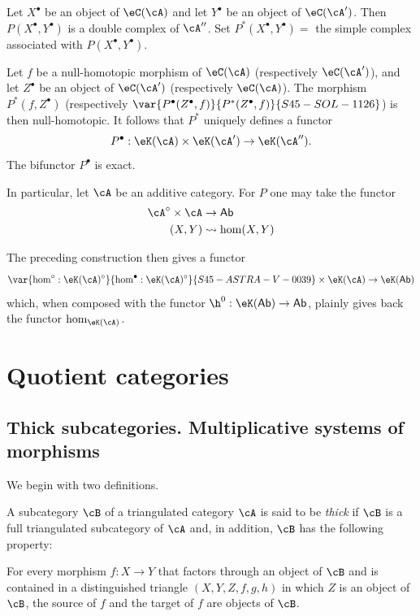 Let $X^\bullet$ be an object of $\eC(\cA)$ and let $Y^\bullet$ be an
object of $\eC(\cA')$. Then $P(X^\bullet,Y^\bullet)$ is a double complex
of $\cA''$. Set $P^\ast(X^\bullet,Y^\bullet) = $ the simple complex
associated with $P(X^\bullet,Y^\bullet)$.

Let $f$ be a null-homotopic morphism of $\eC(\cA)$ (respectively
$\eC(\cA')$), and let $Z^\bullet$ be an object of $\eC(\cA')$
(respectively $\eC(\cA)$). The morphism $P^\ast(f,Z^\bullet)$
(respectively $\var{P^\bullet(Z^\bullet,f)}{P^\ast(Z^\bullet,f)}{S45-SOL-1126}$) is then null-homotopic. It follows
that $P^\ast$ uniquely defines a functor
\[
  P^\bullet:\eK(\cA) \times \eK(\cA') \to \eK(\cA'') \text{.}
\]
The bifunctor $P^\bullet$ is exact.

In particular, let $\cA$ be an additive category. For $P$ one may take
the functor
\begin{align*}
  \cA^\circ\times \cA &\to \mathsf{Ab} \\
  (X,Y) &\leadsto \hom(X,Y)
\end{align*}

The preceding construction then gives a functor
\[
  \var{\hom^\circ:\eK(\cA)^\circ}{\hom^\bullet:\eK(\cA)^\circ}{S45-ASTRA-V-0039} \times \eK(\cA) \to \eK(\mathsf{Ab})
\]
which, when composed with the functor
$\h^0:\eK(\mathsf{Ab})\to \mathsf{Ab}$, plainly gives back the functor
$\hom_{\eK(\cA)}$.

\section{Quotient categories}\label{VIII:2}

\subsection{Thick subcategories. Multiplicative systems of morphisms}\label{VIII:2-1}

We begin with two definitions.

\begin{definition}\label{VIII:2-1-1}
A subcategory $\cB$ of a triangulated category $\cA$ is said to be
\emph{thick} if $\cB$ is a full triangulated subcategory of $\cA$ and,
in addition, $\cB$ has the following property:

For every morphism $f:X\to Y$ that factors through an object of $\cB$ and
is contained in a distinguished triangle $(X,Y,Z,f,g,h)$ in which $Z$ is
an object of $\cB$, the source of $f$ and the target of $f$ are objects of
$\cB$.
\end{definition}

